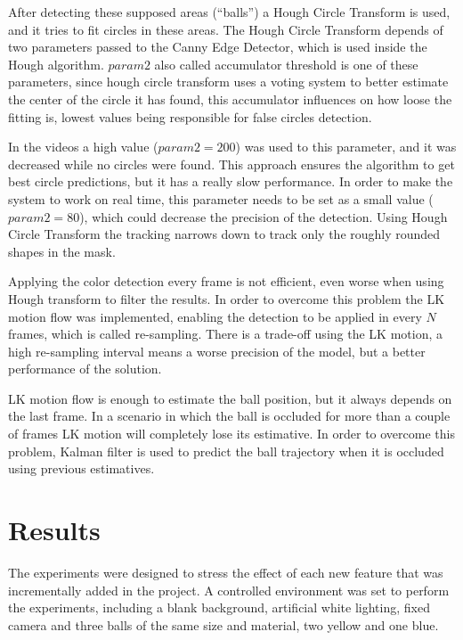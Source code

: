 \documentclass[10pt,twocolumn,letterpaper]{article}
\begin{document}
After detecting these supposed areas (``balls'') a Hough Circle Transform  is
used, and it tries to fit circles in these areas. The Hough Circle Transform
depends of two parameters passed to the Canny Edge Detector, which is used
inside the Hough algorithm. $param2$ also called accumulator threshold is one of
these parameters, since hough circle transform uses a voting system to better
estimate the center of the circle it has found, this accumulator influences on
how loose the fitting is, lowest values being responsible for false circles
detection.

In the videos a high value ($param2 = 200$) was used to this parameter, and it was decreased while no circles were found. This approach ensures the algorithm to get best circle predictions, but it has a really slow performance. In order to make the system to work on real time, this parameter needs to be set as a small value ($param2 = 80$), which could decrease the precision of the detection. Using Hough Circle Transform the tracking narrows down to track only the roughly rounded shapes in the mask.

Applying the color detection every frame is not efficient, even worse when using
Hough transform to filter the results. In order to overcome this problem the LK
motion flow was implemented, enabling the detection to be applied  in every $N$
frames, which is called re-sampling. There is a trade-off using the LK motion,
a high re-sampling interval means a worse precision of the model, but a better
performance of the solution.

LK motion flow is enough to estimate the ball position, but it always depends on
the last frame. In a scenario in which the ball is occluded for more than a
couple of frames  LK motion will completely lose its estimative. In order to
overcome this problem, Kalman filter is used to predict the ball trajectory
when it is occluded using previous estimatives.

\section{Results}\label{sec:result}

The experiments were designed to stress the effect of each new feature that was incrementally added in the project. A controlled environment was set to perform the experiments, including a blank background, artificial white lighting, fixed camera and three balls of the same size and material, two yellow and one blue.
\end{document}
